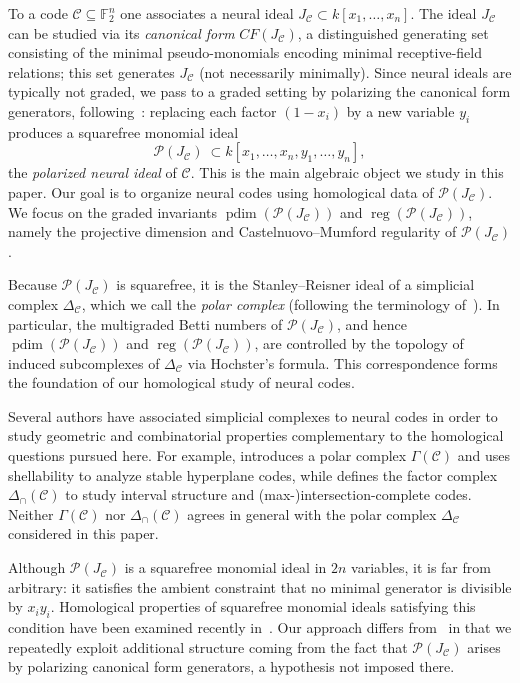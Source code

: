 \documentclass[12pt]{amsart}
\theoremstyle{remark}
\theoremstyle{definition}
\DeclareMathOperator{\reg}{reg}
\DeclareMathOperator{\pd}{pdim}
\newcommand{\F}{\mathbb{F}}
\newcommand{\C}{\mathcal{C}}
\def\P{{\mathcal P}}
\begin{document}
To a code $\C\subseteq \F_2^n$ one associates a neural ideal $J_\C\subset k[x_1,\dots,x_n]$.  The ideal
$J_\C$ can be studied via its \emph{canonical form} $CF(J_\C)$, a distinguished generating set
consisting of the minimal pseudo-monomials encoding minimal receptive-field relations; this set
generates $J_\C$ (not necessarily minimally).  Since neural ideals are typically not graded, we pass
to a graded setting by polarizing the canonical form generators, following~\cite{gjs}: replacing each
factor $(1-x_i)$ by a new variable $y_i$ produces a squarefree monomial ideal
\[
\P(J_\C)\ \subset k[x_1,\dots,x_n,y_1,\dots,y_n],
\]
the \emph{polarized neural ideal} of $\C$.  This is the main algebraic object we study in this paper.
Our goal is to organize neural codes using homological data of $\P(J_\C)$.  We focus on the graded
invariants $\pd(\P(J_\C))$ and $\reg(\P(J_\C))$, namely the projective dimension and
Castelnuovo--Mumford regularity of $\P(J_\C)$.




Because $\P(J_\C)$ is squarefree, it is the Stanley--Reisner ideal of a simplicial complex $\Delta_\C$,
which we call the \emph{polar complex} (following the terminology of~\cite{gjs}).  In particular, the
multigraded Betti numbers of $\P(J_\C)$, and hence $\pd(\P(J_\C))$ and $\reg(\P(J_\C))$, are controlled
by the topology of induced subcomplexes of $\Delta_\C$ via Hochster's formula.  This
correspondence forms the foundation of our homological study of neural codes.




Several authors have associated simplicial complexes to neural codes in order to study geometric and
combinatorial properties complementary to the homological questions pursued here.  For example,
\cite{IKR_hyperplane_polar} introduces a polar complex $\Gamma(\C)$  and uses
shellability to analyze stable hyperplane codes, while \cite{PMS_factor_complex} defines the factor
complex $\Delta_\cap(\C)$ to study interval structure and (max-)intersection-complete codes.  Neither
$\Gamma(\C)$ nor $\Delta_\cap(\C)$ agrees in general with the polar complex $\Delta_\C$ considered in
this paper.



Although $\P(J_\C)$ is a squarefree monomial ideal in $2n$ variables, it is far from arbitrary: it
satisfies the ambient constraint that no minimal generator is divisible by $x_i y_i$.  Homological
properties of squarefree monomial ideals satisfying this condition have been examined recently
in~\cite{chau2025neural}.  Our approach differs from~\cite{chau2025neural} in that we repeatedly
exploit additional structure coming from the fact that $\P(J_\C)$ arises by polarizing canonical
form generators, a hypothesis not imposed there.  
\end{document}
